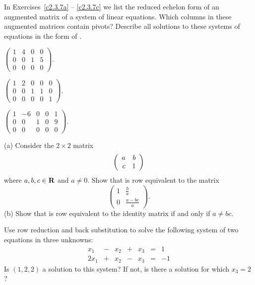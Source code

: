 \noindent In Exercises~\ref{c2.3.7a} -- \ref{c2.3.7c} we list
the reduced echelon form of an augmented matrix of a system of
linear equations.  Which columns in these augmented matrices
contain pivots?  Describe all solutions to these systems of
equations in the form of .
\begin{exercise} \label{c2.3.7a}
$\left(\begin{array}{rrr|r}
 1  &  4 & 0 & 0\\
 0  &  0 & 1 & 5\\
 0  &  0 & 0 & 0
\end{array}\right)$.
\end{exercise}
\begin{exercise} \label{c2.3.7b}
$\left(\begin{array}{rrrr|r}
 1  &  2 & 0 & 0 & 0\\
 0  &  0 & 1 & 1 & 0\\
 0  &  0 & 0 & 0 & 1
\end{array}\right)$.
\end{exercise}
\begin{exercise} \label{c2.3.7c}
$\left(\begin{array}{rrrr|r}
 1  & -6 & 0 & 0 & 1\\
 0  &  0 & 1 & 0 & 9 \\
 0  &  0 & 0 & 0 & 0
\end{array}\right)$.
\end{exercise}


\begin{exercise} \label{c2.3.8}
(a) Consider the $2\times 2$ matrix
\begin{equation}  \label{e:2x2}
\left(\begin{array}{rr} a & b\\ c &1\end{array}\right)
\end{equation}
where $a,b,c\in\mbox{$\bf{R}$}$ and $a\neq 0$.  Show that 
is row equivalent to the matrix
\[
\left(\begin{array}{cc} 1 & \frac{b}{a} \\ 0 & \frac{a-bc}{a}
\end{array} \right).
\]
(b)  Show that  is row equivalent to the
identity matrix if and only if $a\neq bc$.
\end{exercise}

\begin{exercise} \label{c2.3.9}
Use row reduction and back substitution to solve the following
system of two equations in three unknowns:
\[
\begin{array}{rcrcrcrc}
 x_1 & - & x_2 & + & x_3 & = & 1 \\
2x_1 & + & x_2 & - & x_3 & = & -1
\end{array}
\]
Is $(1,2,2)$ a solution to this system?  If not, is there a
solution for which $x_3=2$?
\end{exercise}

